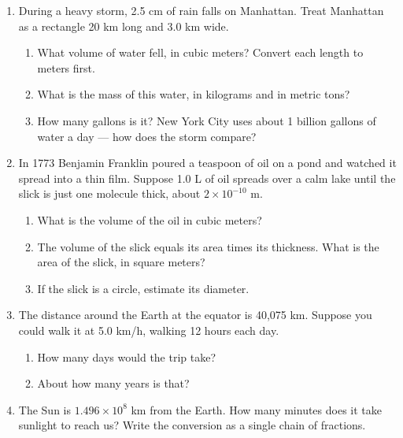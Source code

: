 \documentclass[12pt, twoside]{article}
\begin{document}
\begin{enumerate}[itemsep=0.5cm]

\item During a heavy storm, 2.5 cm of rain falls on Manhattan. Treat Manhattan as a
  rectangle 20 km long and 3.0 km wide.
  \begin{enumerate}[itemsep=4.6cm]
    \item What volume of water fell, in cubic meters? Convert each length to meters
      first.
    \item What is the mass of this water, in kilograms and in metric tons?
    \item How many gallons is it? New York City uses about 1 billion gallons of water
      a day --- how does the storm compare?
  \end{enumerate}

\newpage

\item In 1773 Benjamin Franklin poured a teaspoon of oil on a pond and watched it
  spread into a thin film. Suppose 1.0 L of oil spreads over a calm lake until the
  slick is just one molecule thick, about $2 \times 10^{-10}$ m.
  \begin{enumerate}[itemsep=2.1cm]
    \item What is the volume of the oil in cubic meters?
    \item The volume of the slick equals its area times its thickness. What is the
      area of the slick, in square meters?
    \item If the slick is a circle, estimate its diameter.
  \end{enumerate} \vspace{2.0cm}

\item The distance around the Earth at the equator is 40{,}075 km. Suppose you could
  walk it at 5.0 km/h, walking 12 hours each day.
  \begin{enumerate}[itemsep=2.0cm]
    \item How many days would the trip take?
    \item About how many years is that?
  \end{enumerate} \vspace{2.0cm}

\item The Sun is $1.496 \times 10^{8}$ km from the Earth. How many minutes does it
  take sunlight to reach us? Write the conversion as a single chain of fractions.

\end{enumerate}
\end{document}

